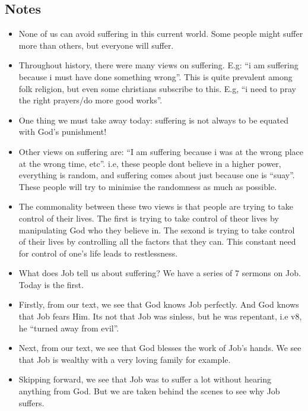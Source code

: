 \subsection*{Notes}
\begin{itemize}
  \item{None of us can avoid suffering in this current world. Some people might suffer more than others, but everyone will suffer.} 
  \item{Throughout history, there were many views on suffering. E.g: “i am suffering because i must have done something wrong”. This is quite prevalent among folk religion, but even some christians subscribe to this. E.g, “i need to pray the right prayers/do more good works”. }
  \item{One thing we must take away today: suffering is not always to be equated with God’s punishment! }
  \item{Other views on suffering are: “I am suffering because i was at the wrong place at the wrong time, etc”. i.e, these people dont believe in a higher power, everything is random, and suffering comes about just because one is “suay”. These people will try to minimise the randomness as much as possible.}
  \item{The commonality between these two views is that people are trying to take control of their lives. The first is trying to take control of theor lives by manipulating God who they believe in. The sexond is trying to take control of their lives by controlling all the factors that they can. This constant need for control of one’s life leads to restlessness.}
  \item{What does Job tell us about suffering? We have a series of 7 sermons on Job. Today is the first.}
  \item{Firstly, from our text, we see that God knows Job perfectly. And God knows that Job fears Him. Its not that Job was sinless, but he was repentant, i.e v8, he “turned away from evil”. }
  \item{Next, from our text, we see that God blesses the work of Job’s hands. We see that Job is wealthy with a very loving family for example.}
  \item{Skipping forward, we see that Job was to suffer a lot without hearing anything from God. But we are taken behind the scenes to see why Job suffers.}

\end{itemize}
